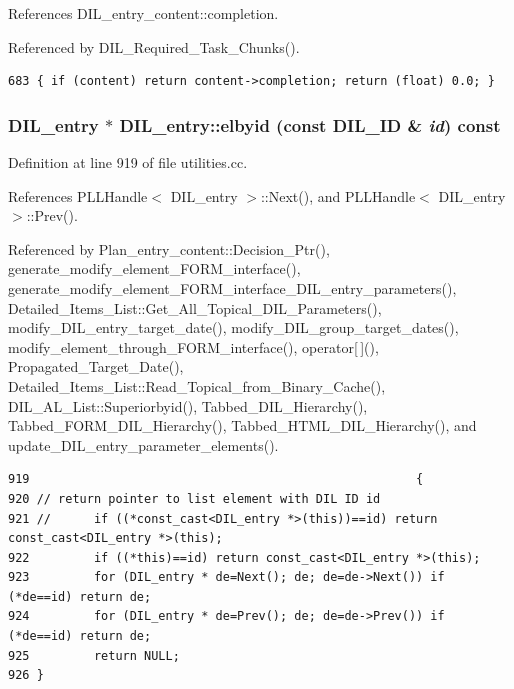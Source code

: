 References DIL\_\-entry\_\-content::completion.

Referenced by DIL\_\-Required\_\-Task\_\-Chunks().



\footnotesize\begin{verbatim}683 { if (content) return content->completion; return (float) 0.0; }
\end{verbatim}\normalsize 
{}
\subsubsection{\setlength{\rightskip}{0pt plus 5cm}DIL\_\-entry $\ast$ DIL\_\-entry::elbyid (const {\bf DIL\_\-ID} \& {\em id}) const}\label{classDIL__entry_a4}




Definition at line 919 of file utilities.cc.

References PLLHandle$<$ DIL\_\-entry $>$::Next(), and PLLHandle$<$ DIL\_\-entry $>$::Prev().

Referenced by Plan\_\-entry\_\-content::Decision\_\-Ptr(), generate\_\-modify\_\-element\_\-FORM\_\-interface(), generate\_\-modify\_\-element\_\-FORM\_\-interface\_\-DIL\_\-entry\_\-parameters(), Detailed\_\-Items\_\-List::Get\_\-All\_\-Topical\_\-DIL\_\-Parameters(), modify\_\-DIL\_\-entry\_\-target\_\-date(), modify\_\-DIL\_\-group\_\-target\_\-dates(), modify\_\-element\_\-through\_\-FORM\_\-interface(), operator[$\,$](), Propagated\_\-Target\_\-Date(), Detailed\_\-Items\_\-List::Read\_\-Topical\_\-from\_\-Binary\_\-Cache(), DIL\_\-AL\_\-List::Superiorbyid(), Tabbed\_\-DIL\_\-Hierarchy(), Tabbed\_\-FORM\_\-DIL\_\-Hierarchy(), Tabbed\_\-HTML\_\-DIL\_\-Hierarchy(), and update\_\-DIL\_\-entry\_\-parameter\_\-elements().



\footnotesize\begin{verbatim}919                                                      {
920 // return pointer to list element with DIL ID id
921 //      if ((*const_cast<DIL_entry *>(this))==id) return const_cast<DIL_entry *>(this);
922         if ((*this)==id) return const_cast<DIL_entry *>(this);
923         for (DIL_entry * de=Next(); de; de=de->Next()) if (*de==id) return de;
924         for (DIL_entry * de=Prev(); de; de=de->Prev()) if (*de==id) return de;
925         return NULL;
926 }
\end{verbatim}\normalsize 
{}
